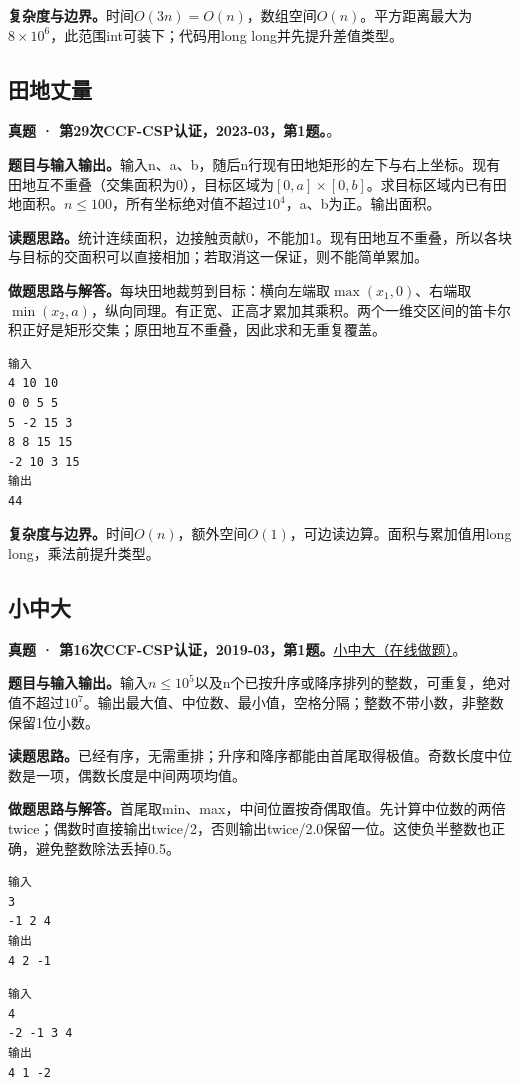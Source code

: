 \noindent\textbf{复杂度与边界。}时间$O(3n)=O(n)$，数组空间$O(n)$。平方距离最大为$8\times10^6$，此范围int可装下；代码用long long并先提升差值类型。
\subsection{田地丈量}
\textbf{真题 · 第29次CCF-CSP认证，2023-03，第1题。}。

\noindent\textbf{题目与输入输出。}输入n、a、b，随后n行现有田地矩形的左下与右上坐标。现有田地互不重叠（交集面积为0），目标区域为$[0,a]\times[0,b]$。求目标区域内已有田地面积。$n\le100$，所有坐标绝对值不超过$10^4$，a、b为正。输出面积。

\noindent\textbf{读题思路。}统计连续面积，边接触贡献0，不能加1。现有田地互不重叠，所以各块与目标的交面积可以直接相加；若取消这一保证，则不能简单累加。

\noindent\textbf{做题思路与解答。}每块田地裁剪到目标：横向左端取$\max(x_1,0)$、右端取$\min(x_2,a)$，纵向同理。有正宽、正高才累加其乘积。两个一维交区间的笛卡尔积正好是矩形交集；原田地互不重叠，因此求和无重复覆盖。
\begin{verbatim}
输入
4 10 10
0 0 5 5
5 -2 15 3
8 8 15 15
-2 10 3 15
输出
44
\end{verbatim}

\noindent\textbf{复杂度与边界。}时间$O(n)$，额外空间$O(1)$，可边读边算。面积与累加值用long long，乘法前提升类型。
\subsection{小中大}
\textbf{真题 · 第16次CCF-CSP认证，2019-03，第1题。}\href{https://www.acwing.com/problem/content/3275/}{小中大（在线做题）}。

\noindent\textbf{题目与输入输出。}输入$n\le10^5$以及n个已按升序或降序排列的整数，可重复，绝对值不超过$10^7$。输出最大值、中位数、最小值，空格分隔；整数不带小数，非整数保留1位小数。

\noindent\textbf{读题思路。}已经有序，无需重排；升序和降序都能由首尾取得极值。奇数长度中位数是一项，偶数长度是中间两项均值。

\noindent\textbf{做题思路与解答。}首尾取min、max，中间位置按奇偶取值。先计算中位数的两倍twice；偶数时直接输出twice/2，否则输出twice/2.0保留一位。这使负半整数也正确，避免整数除法丢掉0.5。
\begin{verbatim}
输入
3
-1 2 4
输出
4 2 -1
\end{verbatim}
\begin{verbatim}
输入
4
-2 -1 3 4
输出
4 1 -2
\end{verbatim}

